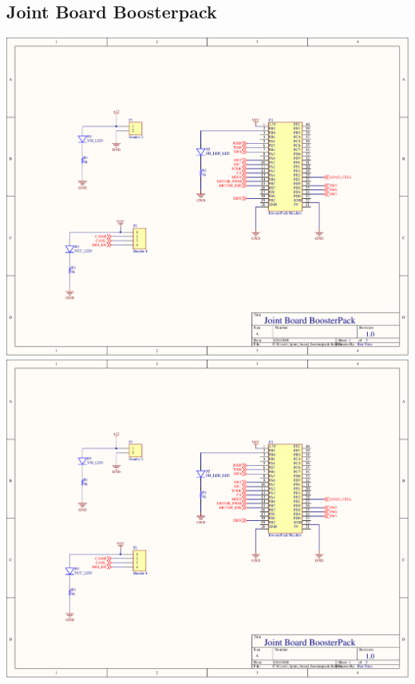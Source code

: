 \begin{flushleft}
\section{Joint Board Boosterpack}
\end{flushleft}
\label{app:joint_board_boosterpack}
\centering
\includegraphics[page=1,width=\textwidth,angle=270]{PDFs/joint_board_boosterpack.PDF} \newpage
\includegraphics[page=2,width=\textwidth,angle=270]{PDFs/joint_board_boosterpack.PDF} \newpage
